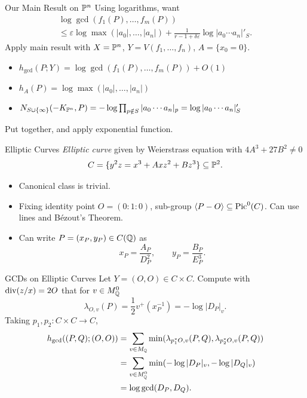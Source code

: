 \documentclass{beamer}
\begin{document}
\begin{frame}{Our Main Result on $\mathbb{P}^n$}
    Using logarithms, want
    \begin{multline*}
        \log \gcd (f_1(P), \ldots, f_m(P)) \\
        \leq \varepsilon \log \max(|a_0|, \ldots, |a_n|)
        + \frac{1}{r - 1 + \delta \varepsilon} \log |a_0 \cdots a_n|'_S.
    \end{multline*}
    Apply main result with $X = \mathbb{P}^n$, $Y = V(f_1, \ldots, f_n)$, $A = \{ x_0 = 0 \}$.
    \begin{itemize}
        \item $h_{\gcd}(P; Y) = \log \gcd (f_1(P), \ldots, f_m(P)) + O(1)$
        \item $h_A(P) = \log \max(|a_0|, \ldots, |a_n|)$
        \item $N_{S \cup \{ \infty \}}(-K_{\mathbb{P}^n}, P)
        = -\log \prod_{p \notin S} |a_0 \cdots a_n|_p = \log |a_0 \cdots a_n |_S'$
    \end{itemize}
    Put together, and apply exponential function.
\end{frame}

\begin{frame}{Elliptic Curves}
    \textit{Elliptic curve} given by Weierstrass equation with $4A^3 + 27B^2 \neq 0$
    \[
        C = \{ y^2z = x^3 + Axz^2 + Bz^3 \} \subseteq \mathbb{P}^2.
    \]
    \begin{itemize}
        \item Canonical class is trivial. 
        \item Fixing identity point $O = (0 : 1 : 0)$, sub-group $\langle P - O \rangle \subseteq {\rm Pic}^0(C)$. Can use lines and Bézout's Theorem.
        \item Can write $P = (x_P, y_P)  \in C(\mathbb{Q})$ as 
        \[
            x_P = \frac{A_P}{D_P^2}, \qquad y_P = \frac{B_P}{E_P^3}.
        \]
    \end{itemize}
    
\end{frame}

\begin{frame}{GCDs on Elliptic Curves}
    Let $Y = (O, O) \in C \times C$.
    Compute with ${\rm div}(z/x) = 2O$ that for $v \in M_{\mathbb{Q}}^0$
    \[
        \lambda_{O, v}(P) = \frac{1}{2} v^+(x_P^{-1}) = -\log |D_P|_v.
    \]
    Taking $p_1, p_2 : C \times C \to C$,
    \begin{align*}
        h_{\gcd}((P, Q); (O, O))
        & = \sum_{v \in M_{\mathbb{Q}}} \min (\lambda_{p_1^* O, v}(P, Q), \lambda_{p_2^* O, v}(P, Q)) \\
        & = \sum_{v \in M_{\mathbb{Q}}^0} \min(- \log |D_P|_v, -\log |D_Q|_v) \\
        & = \log \gcd (D_P, D_Q).
    \end{align*}
\end{frame}
\end{document}
